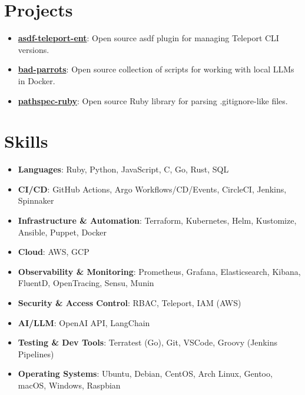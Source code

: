 \documentclass[letterpaper,11pt]{article}
\newcommand{\resumeItem}[2]{
\item[\textgreater]\small{
    \textbf{#1}{: #2 \vspace{-2pt}}
  }
}
\newcommand{\resumeSubItem}[2]{\resumeItem{#1}{#2}\vspace{-4pt}}
\newcommand{\resumeSubHeadingListStart}{\begin{itemize}[leftmargin=*]}
\newcommand{\resumeSubHeadingListEnd}{\end{itemize}}
\begin{document}
\section{Projects}
  \resumeSubHeadingListStart
    \resumeSubItem{\href{https://github.com/highb/asdf-teleport-ent}{asdf-teleport-ent}}
      {Open source asdf plugin for managing Teleport CLI versions.}
    \resumeSubItem{\href{https://github.com/highb/bad-parrots}{bad-parrots}}
      {Open source collection of scripts for working with local LLMs in Docker.}
    \resumeSubItem{\href{https://github.com/highb/pathspec-ruby}{pathspec-ruby}}
      {Open source Ruby library for parsing .gitignore-like files.}
  \resumeSubHeadingListEnd

\section{Skills}
  \resumeSubHeadingListStart
    \item{
      \textbf{Languages}{: Ruby, Python, JavaScript, C, Go, Rust, SQL}
    }
    \item{
      \textbf{CI/CD}{: GitHub Actions, Argo Workflows/CD/Events, CircleCI, Jenkins, Spinnaker}
    }
    \item{
      \textbf{Infrastructure \& Automation}{: Terraform, Kubernetes, Helm, Kustomize, Ansible, Puppet, Docker}
    }
    \item{
      \textbf{Cloud}{: AWS, GCP}
    }
    \item{
      \textbf{Observability \& Monitoring}{: Prometheus, Grafana, Elasticsearch, Kibana, FluentD, OpenTracing, Sensu, Munin}
    }
    \item{
      \textbf{Security \& Access Control}{: RBAC, Teleport, IAM (AWS)}
    }
    \item{
      \textbf{AI/LLM}{: OpenAI API, LangChain}
    }
    \item{
      \textbf{Testing \& Dev Tools}{: Terratest (Go), Git, VSCode, Groovy (Jenkins Pipelines)}
    }
    \item{
      \textbf{Operating Systems}{: Ubuntu, Debian, CentOS, Arch Linux, Gentoo, macOS, Windows, Raspbian}
    }
  \resumeSubHeadingListEnd



\end{document}
